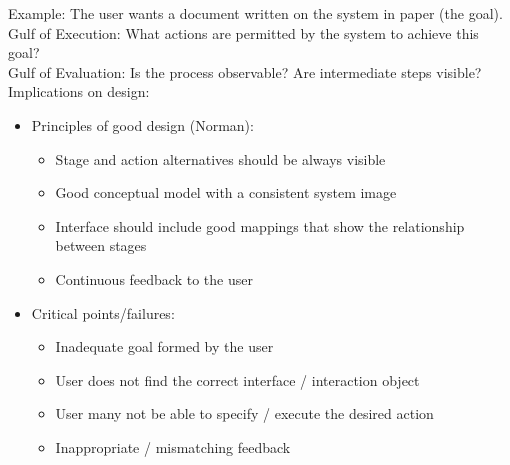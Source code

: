 Example: The user wants a document written on the system in paper (the goal).\\
Gulf of Execution: What actions are permitted by the system to achieve this goal?\\
Gulf of Evaluation: Is the process observable? Are intermediate steps visible?\\
Implications on design:
\begin{itemize}
\item Principles of good design (Norman):
\begin{itemize}
\item Stage and action alternatives should be always visible
\item Good conceptual model with a consistent system image
\item Interface should include good mappings that show the relationship between stages
\item Continuous feedback to the user
\end{itemize}
\item Critical points/failures:
\begin{itemize}
\item Inadequate goal formed by the user
\item User does not find the correct interface / interaction object
\item User many not be able to specify / execute the desired action
\item Inappropriate / mismatching feedback
\end{itemize}
\end{itemize}


